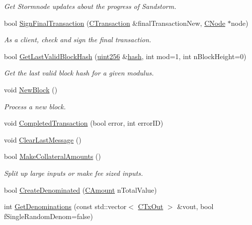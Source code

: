 \begin{DoxyCompactItemize}
\begin{DoxyCompactList}\small\item\em Get Stormnode updates about the progress of Sandstorm. \end{DoxyCompactList}\item 
bool \hyperlink{class_c_sandstorm_pool_adfe5727cd162dff15a016de05494ba44}{Sign\+Final\+Transaction} (\hyperlink{class_c_transaction}{C\+Transaction} \&final\+Transaction\+New, \hyperlink{class_c_node}{C\+Node} $\ast$node)
\begin{DoxyCompactList}\small\item\em As a client, check and sign the final transaction. \end{DoxyCompactList}\item 
bool \hyperlink{class_c_sandstorm_pool_a97b7eb9ae039822b13de52c0cfd6750c}{Get\+Last\+Valid\+Block\+Hash} (\hyperlink{classuint256}{uint256} \&\hyperlink{cache_8cc_a11ecb029164e055f28f4123ce3748862}{hash}, int mod=1, int n\+Block\+Height=0)
\begin{DoxyCompactList}\small\item\em Get the last valid block hash for a given modulus. \end{DoxyCompactList}\item 
void \hyperlink{class_c_sandstorm_pool_a657fcb1ca83116777fdcfed8676107ea}{New\+Block} ()
\begin{DoxyCompactList}\small\item\em Process a new block. \end{DoxyCompactList}\item 
void \hyperlink{class_c_sandstorm_pool_a4a844b1153973243d27a5f0702a7245d}{Completed\+Transaction} (bool error, int error\+I\+D)
\item 
void \hyperlink{class_c_sandstorm_pool_a80117149700bcbf278af2ad3f9c8f4f7}{Clear\+Last\+Message} ()
\item 
bool \hyperlink{class_c_sandstorm_pool_af0d8155078c47c07ea80ce65f317940a}{Make\+Collateral\+Amounts} ()
\begin{DoxyCompactList}\small\item\em Split up large inputs or make fee sized inputs. \end{DoxyCompactList}\item 
bool \hyperlink{class_c_sandstorm_pool_ab7fac1067376f91b53aaf6862c15e914}{Create\+Denominated} (\hyperlink{amount_8h_a4eaf3a5239714d8c45b851527f7cb564}{C\+Amount} n\+Total\+Value)
\item 
int \hyperlink{class_c_sandstorm_pool_aebbafc6e18044ba973b127787f9ff90b}{Get\+Denominations} (const std\+::vector$<$ \hyperlink{class_c_tx_out}{C\+Tx\+Out} $>$ \&vout, bool f\+Single\+Random\+Denom=false)

\end{DoxyCompactItemize}
